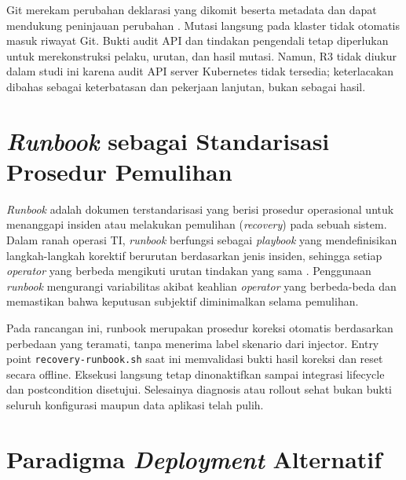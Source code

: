 Git merekam perubahan deklarasi yang dikomit beserta metadata dan dapat mendukung peninjauan perubahan \citep{opengitops2021}. Mutasi langsung pada klaster tidak otomatis masuk riwayat Git. Bukti audit API dan tindakan pengendali tetap diperlukan untuk merekonstruksi pelaku, urutan, dan hasil mutasi. Namun, R3 tidak diukur dalam studi ini karena audit API server Kubernetes tidak tersedia; keterlacakan dibahas sebagai keterbatasan dan pekerjaan lanjutan, bukan sebagai hasil.

\section{\textit{Runbook} sebagai Standarisasi Prosedur Pemulihan}

\textit{Runbook} adalah dokumen terstandarisasi yang berisi prosedur operasional untuk menanggapi insiden atau melakukan pemulihan (\textit{recovery}) pada sebuah sistem. Dalam ranah operasi TI, \textit{runbook} berfungsi sebagai \textit{playbook} yang mendefinisikan langkah-langkah korektif berurutan berdasarkan jenis insiden, sehingga setiap \textit{operator} yang berbeda mengikuti urutan tindakan yang sama \citep{schlette2024playbook}. Penggunaan \textit{runbook} mengurangi variabilitas akibat keahlian \textit{operator} yang berbeda-beda dan memastikan bahwa keputusan subjektif diminimalkan selama pemulihan.

Pada rancangan ini, runbook merupakan prosedur koreksi otomatis berdasarkan perbedaan yang teramati, tanpa menerima label skenario dari injector. Entry point \texttt{recovery-runbook.sh} saat ini memvalidasi bukti hasil koreksi dan reset secara offline. Eksekusi langsung tetap dinonaktifkan sampai integrasi lifecycle dan postcondition disetujui. Selesainya diagnosis atau rollout sehat bukan bukti seluruh konfigurasi maupun data aplikasi telah pulih.

\section{Paradigma \textit{Deployment} Alternatif}

